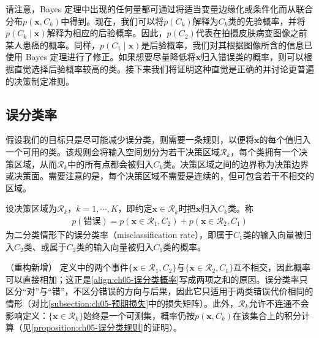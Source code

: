 \documentclass[../../main.tex]{subfiles}
\begin{document}
请注意，Bayes 定理中出现的任何量都可通过将适当变量边缘化或条件化而从联合分布$p(\boldsymbol{x},C_k)$中得到。现在，我们可以将$p(C_k)$解释为$C_k$类的先验概率，并将$p(C_k\mid\boldsymbol{x})$解释为相应的后验概率。因此，$p(C_2)$代表在拍摄皮肤病变图像之前某人患癌的概率。同样，$p(C_1\mid\boldsymbol{x})$是后验概率，我们对其根据图像所含的信息已使用 Bayes 定理进行了修正。如果想要尽量降低将$\boldsymbol{x}$归入错误类的概率，则可以根据直觉选择后验概率较高的类。接下来我们将证明这种直觉是正确的并讨论更普遍的决策制定准则。

\subsection{误分类率}\label{subsection:ch05-误分类率}

假设我们的目标只是尽可能减少误分类，则需要一条规则，以便将$\boldsymbol{x}$的每个值归入一个可用的类。该规则会将输入空间划分为若干决策区域$\mathcal{R}_k$，每个类拥有一个决策区域，从而$\mathcal{R}_k$中的所有点都会被归入$C_k$类。决策区域之间的边界称为决策边界或决策面。需要注意的是，每个决策区域不需要是连续的，但可包含若干不相交的区域。

\begin{definition}[误分类率]\label{definition:ch05-误分类率}
设决策区域为$\mathcal{R}_k$，$k=1,\cdots,K$，即约定$\boldsymbol{x}\in\mathcal{R}_k$时把$\boldsymbol{x}$归入$C_k$类。称
\begin{align}
  p(\text{错误})=p(\boldsymbol{x}\in\mathcal{R}_1,C_2)+p(\boldsymbol{x}\in\mathcal{R}_2,C_1)
  \label{align:ch05-误分类概率}
\end{align}
为二分类情形下的误分类率（misclassification rate），即属于$C_1$类的输入向量被归入$C_2$类、或属于$C_2$类的输入向量被归入$C_1$类的概率。
\end{definition}

\begin{remark}（重构新增）
定义中的两个事件$\{\boldsymbol{x}\in\mathcal{R}_1,C_2\}$与$\{\boldsymbol{x}\in\mathcal{R}_2,C_1\}$互不相交，因此概率可以直接相加；这正是\eqref{align:ch05-误分类概率}写成两项之和的原因。误分类率只区分“对”与“错”，不区分错误的方向与后果，因此它只适用于两类错误代价相同的情形（对比\cref{subsection:ch05-预期损失}中的损失矩阵）。此外，$\mathcal{R}_k$允许不连通不会影响定义：$\{\boldsymbol{x}\in\mathcal{R}_k\}$始终是一个可测集，概率仍按$p(\boldsymbol{x},C_k)$在该集合上的积分计算（见\cref{proposition:ch05-误分类规则}的证明）。
\end{remark}
\end{document}
